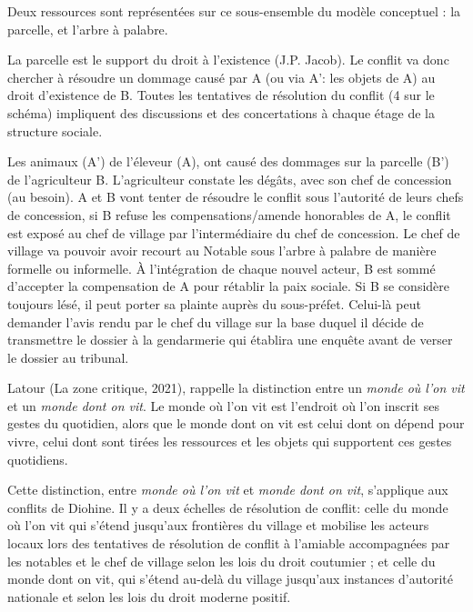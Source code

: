 Deux ressources sont représentées sur ce sous-ensemble du modèle conceptuel : la parcelle, et l'arbre à palabre.

La parcelle est le support du droit à l'existence (J.P. Jacob). Le conflit va donc chercher à résoudre un dommage causé par A (ou via A': les objets de A) au droit d'existence de B. Toutes les tentatives de résolution du conflit (4 sur le schéma) impliquent des discussions et des concertations à chaque étage de la structure sociale.

Les animaux (A') de l'éleveur (A), ont causé des dommages sur la parcelle (B') de l'agriculteur B. L'agriculteur constate les dégâts, avec son chef de concession (au besoin). A et B vont tenter de résoudre le conflit sous l'autorité de leurs chefs de concession, si B refuse les compensations/amende honorables de A, le conflit est exposé au chef de village par l'intermédiaire du chef de concession. Le chef de village va pouvoir avoir recourt au Notable sous l'arbre à palabre de manière formelle ou informelle. À l'intégration de chaque nouvel acteur, B est sommé d'accepter la compensation de A pour rétablir la paix sociale. Si B se considère toujours lésé, il peut porter sa plainte auprès du sous-préfet. Celui-là peut demander l'avis rendu par le chef du village sur la base duquel il décide de transmettre le dossier à la gendarmerie qui établira une enquête avant de verser le dossier au tribunal.

Latour (La zone critique, 2021), rappelle la distinction entre  un \textit{monde où l'on vit} et un \textit{monde dont on vit}. Le monde où l'on vit  est l'endroit où l'on inscrit ses gestes du quotidien, alors que le monde dont on vit est  celui dont on dépend pour vivre, celui dont sont tirées les ressources et les objets qui supportent ces gestes quotidiens.

Cette distinction, entre \textit{monde où l'on vit} et \textit{monde dont on vit}, s'applique aux conflits de Diohine. Il y a deux échelles de résolution de conflit:  celle du monde où l'on vit qui s'étend jusqu'aux frontières du village et mobilise les acteurs locaux lors des tentatives de résolution de conflit à l'amiable accompagnées par les notables et le chef de village selon les lois du droit coutumier ; et celle du monde dont on vit, qui s'étend au-delà du village jusqu'aux instances d'autorité nationale et selon les lois du droit moderne positif.

